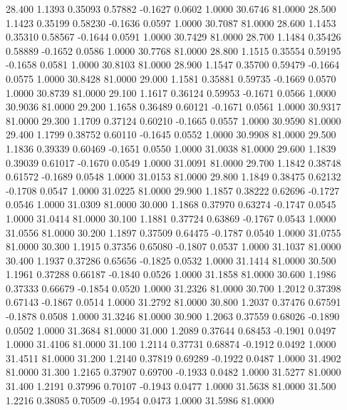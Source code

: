   28.400   1.1393   0.35093   0.57882  -0.1627   0.0602   1.0000  30.6746  81.0000
  28.500   1.1423   0.35199   0.58230  -0.1636   0.0597   1.0000  30.7087  81.0000
  28.600   1.1453   0.35310   0.58567  -0.1644   0.0591   1.0000  30.7429  81.0000
  28.700   1.1484   0.35426   0.58889  -0.1652   0.0586   1.0000  30.7768  81.0000
  28.800   1.1515   0.35554   0.59195  -0.1658   0.0581   1.0000  30.8103  81.0000
  28.900   1.1547   0.35700   0.59479  -0.1664   0.0575   1.0000  30.8428  81.0000
  29.000   1.1581   0.35881   0.59735  -0.1669   0.0570   1.0000  30.8739  81.0000
  29.100   1.1617   0.36124   0.59953  -0.1671   0.0566   1.0000  30.9036  81.0000
  29.200   1.1658   0.36489   0.60121  -0.1671   0.0561   1.0000  30.9317  81.0000
  29.300   1.1709   0.37124   0.60210  -0.1665   0.0557   1.0000  30.9590  81.0000
  29.400   1.1799   0.38752   0.60110  -0.1645   0.0552   1.0000  30.9908  81.0000
  29.500   1.1836   0.39339   0.60469  -0.1651   0.0550   1.0000  31.0038  81.0000
  29.600   1.1839   0.39039   0.61017  -0.1670   0.0549   1.0000  31.0091  81.0000
  29.700   1.1842   0.38748   0.61572  -0.1689   0.0548   1.0000  31.0153  81.0000
  29.800   1.1849   0.38475   0.62132  -0.1708   0.0547   1.0000  31.0225  81.0000
  29.900   1.1857   0.38222   0.62696  -0.1727   0.0546   1.0000  31.0309  81.0000
  30.000   1.1868   0.37970   0.63274  -0.1747   0.0545   1.0000  31.0414  81.0000
  30.100   1.1881   0.37724   0.63869  -0.1767   0.0543   1.0000  31.0556  81.0000
  30.200   1.1897   0.37509   0.64475  -0.1787   0.0540   1.0000  31.0755  81.0000
  30.300   1.1915   0.37356   0.65080  -0.1807   0.0537   1.0000  31.1037  81.0000
  30.400   1.1937   0.37286   0.65656  -0.1825   0.0532   1.0000  31.1414  81.0000
  30.500   1.1961   0.37288   0.66187  -0.1840   0.0526   1.0000  31.1858  81.0000
  30.600   1.1986   0.37333   0.66679  -0.1854   0.0520   1.0000  31.2326  81.0000
  30.700   1.2012   0.37398   0.67143  -0.1867   0.0514   1.0000  31.2792  81.0000
  30.800   1.2037   0.37476   0.67591  -0.1878   0.0508   1.0000  31.3246  81.0000
  30.900   1.2063   0.37559   0.68026  -0.1890   0.0502   1.0000  31.3684  81.0000
  31.000   1.2089   0.37644   0.68453  -0.1901   0.0497   1.0000  31.4106  81.0000
  31.100   1.2114   0.37731   0.68874  -0.1912   0.0492   1.0000  31.4511  81.0000
  31.200   1.2140   0.37819   0.69289  -0.1922   0.0487   1.0000  31.4902  81.0000
  31.300   1.2165   0.37907   0.69700  -0.1933   0.0482   1.0000  31.5277  81.0000
  31.400   1.2191   0.37996   0.70107  -0.1943   0.0477   1.0000  31.5638  81.0000
  31.500   1.2216   0.38085   0.70509  -0.1954   0.0473   1.0000  31.5986  81.0000
